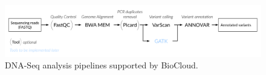 \begin{figure}[!htbp]
\centering
\includegraphics[width=\textwidth]{images/dnaseq_pipelines}
\caption[DNA-Seq analysis pipelines]{DNA-Seq analysis pipelines supported by BioCloud.}
\label{fig:dnaseq-pipeline}
\end{figure}
